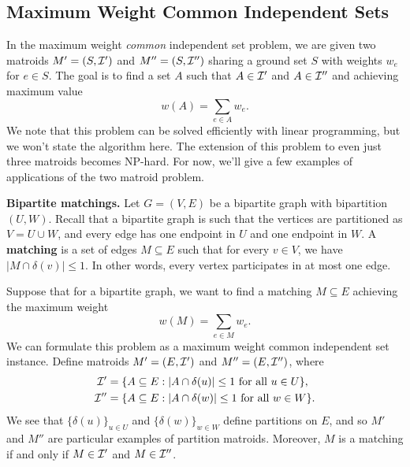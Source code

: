 \subsection{Maximum Weight Common Independent Sets} \label{subsec:4.3}
In the maximum weight \emph{common} independent set problem, we are given 
two matroids $M' = (S, {\cal I}')$ and $M'' = (S, {\cal I}'')$ sharing a 
ground set $S$ with weights $w_e$ for $e \in S$. The goal is to find 
a set $A$ such that $A \in {\cal I}'$ and $A \in {\cal I}''$ and 
achieving maximum value 
\[ w(A) = \sum_{e\in A} w_e. \] 
We note that this problem can be solved efficiently with linear programming, 
but we won't state the algorithm here. The extension of this problem 
to even just three matroids becomes NP-hard. For now, we'll give a few 
examples of applications of the two matroid problem. 

{\bf Bipartite matchings.} Let $G = (V, E)$ be a bipartite graph with 
bipartition $(U, W)$. Recall that a bipartite graph is such that 
the vertices are partitioned as $V = U \cup W$, and every edge has 
one endpoint in $U$ and one endpoint in $W$. A {\bf matching} is a set 
of edges $M \subseteq E$ such that for every $v \in V$, we have 
$|M \cap \delta(v)| \leq 1$. In other words, every vertex participates 
in at most one edge. 

Suppose that for a bipartite graph, we want to find a matching $M \subseteq E$
achieving the maximum weight
\[ w(M) = \sum_{e\in M} w_e. \] 
We can formulate this problem as a maximum weight common independent set instance. 
Define matroids $M' = (E, {\cal I}')$ and $M'' = (E, {\cal I}'')$, where 
\begin{align*}
    {\cal I}' &= \{A \subseteq E : |A \cap \delta(u)| \leq 1 \text{ for all } u \in U\}, \\ 
    {\cal I}'' &= \{A \subseteq E : |A \cap \delta(w)| \leq 1 \text{ for all } w \in W\}.
\end{align*}
We see that $\{\delta(u)\}_{u\in U}$ and $\{\delta(w)\}_{w\in W}$ define 
partitions on $E$, and so $M'$ and $M''$ are particular examples of partition 
matroids. Moreover, $M$ is a matching if and only if $M \in {\cal I}'$ and 
$M \in {\cal I}''$. 


